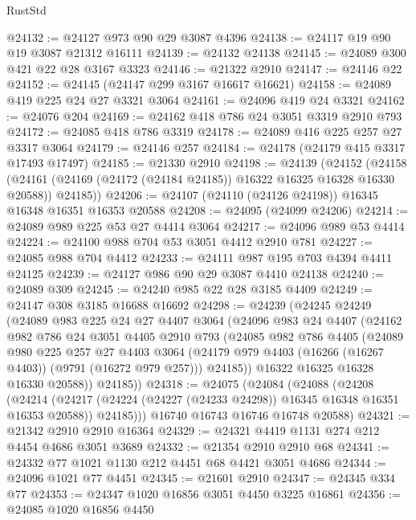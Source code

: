 \begin{lexlean}{RustStd}
\begin{coremodule}
@24132 := @24127 @973 @90 @29 @3087 @4396
@24138 := @24117 @19 @90 @19 @3087 @21312 @16111
@24139 := @24132 @24138
@24145 := @24089 @300 @421 @22 @28 @3167 @3323
@24146 := @21322 @2910
@24147 := @24146 @22
@24152 := @24145 (@24147 @299 @3167 @16617 @16621)
@24158 := @24089 @419 @225 @24 @27 @3321 @3064
@24161 := @24096 @419 @24 @3321
@24162 := @24076 @204
@24169 := @24162 @418 @786 @24 @3051 @3319 @2910 @793
@24172 := @24085 @418 @786 @3319
@24178 := @24089 @416 @225 @257 @27 @3317 @3064
@24179 := @24146 @257
@24184 := @24178 (@24179 @415 @3317 @17493 @17497)
@24185 := @21330 @2910
@24198 := @24139
    (@24152
      (@24158 (@24161 (@24169 (@24172 (@24184 @24185)) @16322 @16325 @16328 @16330 @20588)) @24185))
@24206 := @24107 (@24110 (@24126 @24198)) @16345 @16348 @16351 @16353 @20588
@24208 := @24095 (@24099 @24206)
@24214 := @24089 @989 @225 @53 @27 @4414 @3064
@24217 := @24096 @989 @53 @4414
@24224 := @24100 @988 @704 @53 @3051 @4412 @2910 @781
@24227 := @24085 @988 @704 @4412
@24233 := @24111 @987 @195 @703 @4394 @4411 @24125
@24239 := @24127 @986 @90 @29 @3087 @4410 @24138
@24240 := @24089 @309
@24245 := @24240 @985 @22 @28 @3185 @4409
@24249 := @24147 @308 @3185 @16688 @16692
@24298 := @24239
    (@24245
      @24249
      (@24089
        @983
        @225
        @24
        @27
        @4407
        @3064
        (@24096
          @983
          @24
          @4407
          (@24162
            @982
            @786
            @24
            @3051
            @4405
            @2910
            @793
            (@24085
              @982
              @786
              @4405
              (@24089
                @980
                @225
                @257
                @27
                @4403
                @3064
                (@24179 @979 @4403 (@16266 (@16267 @4403)) (@9791 (@16272 @979 @257)))
                @24185))
            @16322
            @16325
            @16328
            @16330
            @20588))
        @24185))
@24318 := @24075
    (@24084
      (@24088
        (@24208
          (@24214
            (@24217 (@24224 (@24227 (@24233 @24298)) @16345 @16348 @16351 @16353 @20588))
            @24185)))
      @16740
      @16743
      @16746
      @16748
      @20588)
@24321 := @21342 @2910 @2910 @16364
@24329 := @24321 @4419 @1131 @274 @212 @4454 @4686 @3051 @3689
@24332 := @21354 @2910 @2910 @68
@24341 := @24332 @77 @1021 @1130 @212 @4451 @68 @4421 @3051 @4686
@24344 := @24096 @1021 @77 @4451
@24345 := @21601 @2910
@24347 := @24345 @334 @77
@24353 := @24347 @1020 @16856 @3051 @4450 @3225 @16861
@24356 := @24085 @1020 @16856 @4450

\end{coremodule}
\end{lexlean}
